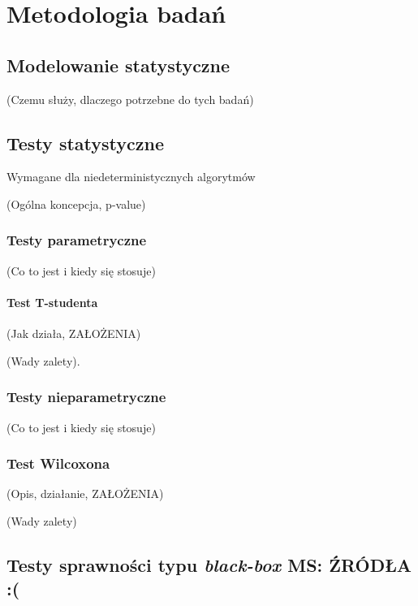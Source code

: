 \documentclass[12pt,a4paper]{report}
\begin{document}
{{{\chapter{Metodologia badań}
\section{Modelowanie statystyczne}
\par{
(Czemu służy, dlaczego potrzebne do tych badań)
}
\section{Testy statystyczne}
\par{
Wymagane dla niedeterministycznych algorytmów
}
\par{
(Ogólna koncepcja, p-value)
}
\subsection{Testy parametryczne}
\par{
(Co to jest i kiedy się stosuje)
}
\subsubsection{Test T-studenta}
\par{
(Jak działa, ZAŁOŻENIA)
}
\par{
(Wady zalety).
}

\subsection{Testy nieparametryczne}
\par{
(Co to jest i kiedy się stosuje)
}
\subsection{Test Wilcoxona}
\label{Wilcoxon}
\par{
(Opis, działanie, ZAŁOŻENIA)
}
\par{
(Wady zalety)
}
\section{Testy sprawności typu \emph{black-box} MS: ŹRÓDŁA :(}
}}}
\end{document}
